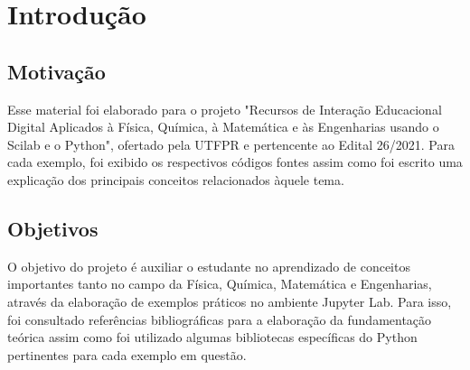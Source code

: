 \chapter{Introdução}

\section{Motivação} %
Esse material foi elaborado para o projeto "Recursos de Interação Educacional Digital Aplicados à Física, Química, à Matemática e às Engenharias usando o Scilab e o Python", ofertado pela UTFPR e pertencente ao Edital 26/2021. Para cada exemplo, foi exibido os respectivos códigos fontes assim como foi escrito uma explicação dos principais conceitos relacionados àquele tema. 

\section{Objetivos}
O objetivo do projeto é auxiliar o estudante no aprendizado de conceitos importantes tanto no campo da Física, Química, Matemática e Engenharias, através da elaboração de exemplos práticos no ambiente Jupyter Lab. Para isso, foi consultado referências bibliográficas para a elaboração da fundamentação teórica assim como foi utilizado algumas bibliotecas específicas do Python pertinentes para cada exemplo em questão.








